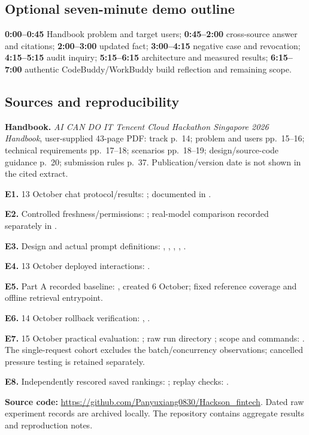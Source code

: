 \documentclass[10pt,a4paper]{article}
\begin{document}
\subsection{Optional seven-minute demo outline}
\textbf{0:00--0:45} Handbook problem and target users; \textbf{0:45--2:00} cross-source answer and citations; \textbf{2:00--3:00} updated fact; \textbf{3:00--4:15} negative case and revocation; \textbf{4:15--5:15} audit inquiry; \textbf{5:15--6:15} architecture and measured results; \textbf{6:15--7:00} authentic CodeBuddy/WorkBuddy build reflection and remaining scope.

\subsection{Sources and reproducibility}
{\footnotesize\raggedright
\textbf{Handbook.} \emph{AI CAN DO IT Tencent Cloud Hackathon Singapore 2026 Handbook}, user-supplied 43-page PDF: track p.~14; problem and users pp.~15--16; technical requirements pp.~17--18; scenarios pp.~18--19; design/source-code guidance p.~20; submission rules p.~37. Publication/version date is not shown in the cited extract.\par
\textbf{E1.} 13 October chat protocol/results: ; documented in .\par
\textbf{E2.} Controlled freshness/permissions: ; real-model comparison recorded separately in .\par
\textbf{E3.} Design and actual prompt definitions: , , , , .\par
\textbf{E4.} 13 October deployed interactions: .\par
\textbf{E5.} Part A recorded baseline: , created 6 October; fixed reference coverage and offline retrieval entrypoint.\par
\textbf{E6.} 14 October rollback verification: , .\par
\textbf{E7.} 15 October practical evaluation: ; raw run directory ; scope and commands: . The single-request cohort excludes the batch/concurrency observations; cancelled pressure testing is retained separately.\par
\textbf{E8.} Independently rescored saved rankings: ; replay checks: .\par
\textbf{Source code:} \url{https://github.com/Panyuxiang0830/Hackson_fintech}. Dated raw experiment records are archived locally. The repository contains aggregate results and reproduction notes.
}
\endgroup
\end{document}
